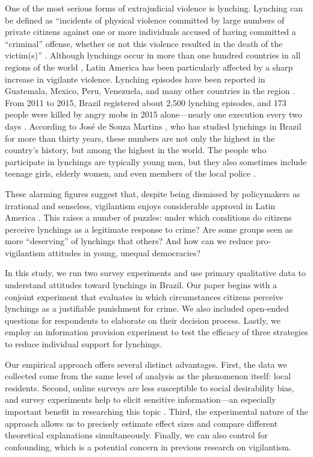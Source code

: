\documentclass[12pt,a4paper]{article}
\begin{document}
One of the most serious forms of extrajudicial violence is lynching. Lynching
can be defined as ``incidents of physical violence committed by large numbers
of private citizens against one or more individuals accused of having committed
a ``criminal'' offense, whether or not this violence resulted in the death of
the victim(s)'' \citep[645]{godoy2004justice}. Although lynchings occur in more
than one hundred countries in all regions of the world
\citep{jung2020lynching,smith2019contradictions}, Latin America has been
particularly affected by a sharp increase in vigilante violence. Lynching
episodes have been reported in Guatemala, Mexico, Peru, Venezuela, and many
other countries in the region \citep{barbara2015vigilantes,
cruz2019determinants, godoy2004justice}. From 2011 to 2015, Brazil registered
about 2,500 lynching episodes, and 173 people were killed by angry mobs in 2015
alone---nearly one execution every two days \citep{barbara2015vigilantes,
oliveira2016mob}. According to José de Souza Martins
\citeyearpar{martins2015linchamentos}, who has studied lynchings in Brazil for
more than thirty years, these numbers are not only the highest in the country's
history, but among the highest in the world. The people who participate in
lynchings are typically young men, but they also sometimes include teenage
girls, elderly women, and even members of the local police
\citep{moura2017linchamentos}.

These alarming figures suggest that, despite being dismissed by policymakers as
irrational and senseless, vigilantism enjoys considerable approval in Latin
America \citep{berg2011globalizing, goldstein2005flexible}. This raises a
number of puzzles: under which conditions do citizens perceive lynchings as a
legitimate response to crime? Are some groups seen as more ``deserving'' of
lynchings that others? And how can we reduce pro-vigilantism attitudes in
young, unequal democracies?

In this study, we run two survey experiments and use primary qualitative data
to understand attitudes toward lynchings in Brazil. Our paper begins with a
conjoint experiment that evaluates in which circumstances citizens perceive
lynchings as a justifiable punishment for crime. We also included open-ended
questions for respondents to elaborate on their decision process. Lastly, we
employ an information provision experiment to test the efficacy of three
strategies to reduce individual support for lynchings.

Our empirical approach offers several distinct advantages. First, the data we
collected come from the same level of analysis as the phenomenon itself: local
residents. Second, online surveys are less susceptible to social desirability
bias, and survey experiments help to elicit sensitive information---an
especially important benefit in researching this topic
\citep{horiuchi2022does}. Third, the experimental nature of the approach allows
us to precisely estimate effect sizes and compare different theoretical
explanations simultaneously. Finally, we can also control for confounding,
which is a potential concern in previous research on vigilantism.
\end{document}
